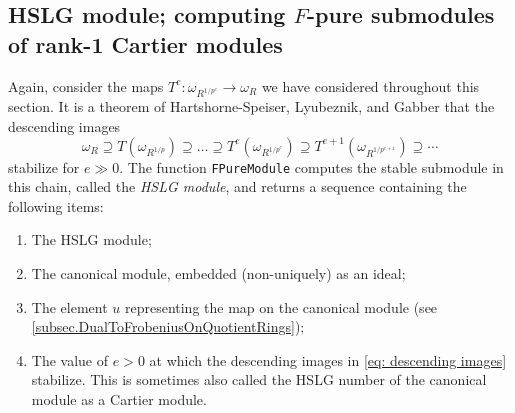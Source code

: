 \documentclass{amsart}
\begin{document}
\subsection{HSLG module; computing $F$-pure submodules of rank-1 Cartier modules}

Again, consider the maps $T^e : \omega_{R^{1/p^e}} \to \omega_R$ we have considered throughout this section.  It is a theorem of Hartshorne-Speiser, Lyubeznik, and Gabber \cite{HartshorneSpeiserLocalCohomologyInCharacteristicP,LyubeznikFModulesApplicationsToLocalCohomology,Gabber.tStruc} that the descending images
\begin{equation}\label{eq: descending images}
\omega_R \supseteq T(\omega_{R^{1/p}}) \supseteq \dots \supseteq T^e(\omega_{R^{1/p^e}}) \supseteq T^{e+1}(\omega_{R^{1/p^{e+1}}}) \supseteq \cdots
\end{equation}
stabilize for $e \gg 0$.
The function \texttt{FPureModule} computes the stable submodule in this chain, called the \emph{HSLG module}, and returns a sequence containing the following items:
\begin{enumerate}[(1)]
   \item The HSLG module;
   \item The canonical module, embedded (non-uniquely) as an ideal;
   \item The element $u$ representing the map on the canonical module (see
   \autoref{subsec.DualToFrobeniusOnQuotientRings});
   \item The value of $e > 0$ at which the descending images in \eqref{eq: descending images} stabilize.  This is sometimes also called the HSLG number of the canonical module as a Cartier module.
\end{enumerate}

\medskip
{\small
{}
}\medskip
\end{document}
